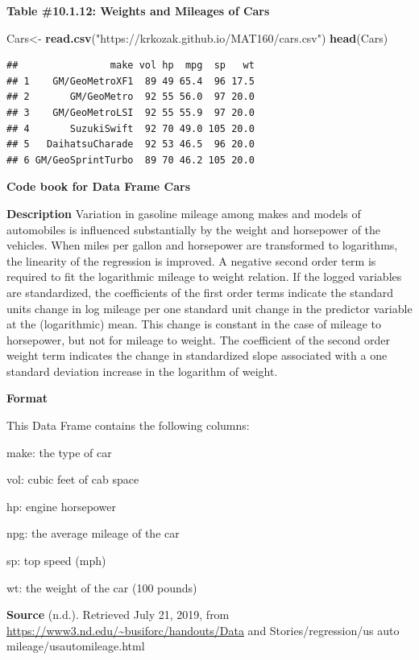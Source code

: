 \documentclass[
]{book}
\newenvironment{Shaded}{\begin{snugshade}}{\end{snugshade}}
\newcommand{\KeywordTok}[1]{\textcolor[rgb]{0.13,0.29,0.53}{\textbf{#1}}}
\newcommand{\NormalTok}[1]{#1}
\newcommand{\StringTok}[1]{\textcolor[rgb]{0.31,0.60,0.02}{#1}}
\begin{document}
\textbf{Table \#10.1.12: Weights and Mileages of Cars}

\begin{Shaded}
\begin{Highlighting}[]
\NormalTok{Cars<-}\StringTok{ }\KeywordTok{read.csv}\NormalTok{(}\StringTok{"https://krkozak.github.io/MAT160/cars.csv"}\NormalTok{)}
\KeywordTok{head}\NormalTok{(Cars)}
\end{Highlighting}
\end{Shaded}

\begin{verbatim}
##                make vol hp  mpg  sp   wt
## 1    GM/GeoMetroXF1  89 49 65.4  96 17.5
## 2       GM/GeoMetro  92 55 56.0  97 20.0
## 3    GM/GeoMetroLSI  92 55 55.9  97 20.0
## 4       SuzukiSwift  92 70 49.0 105 20.0
## 5   DaihatsuCharade  92 53 46.5  96 20.0
## 6 GM/GeoSprintTurbo  89 70 46.2 105 20.0
\end{verbatim}

\textbf{Code book for Data Frame Cars}

\textbf{Description}
Variation in gasoline mileage among makes and models of automobiles is influenced substantially by the weight and horsepower of the vehicles. When miles per gallon and horsepower are transformed to logarithms, the linearity of the regression is improved. A negative second order term is required to fit the logarithmic mileage to weight relation. If the logged variables are standardized, the coefficients of the first order terms indicate the standard units change in log mileage per one standard unit change in the predictor variable at the (logarithmic) mean. This change is constant in the case of mileage to horsepower, but not for mileage to weight. The coefficient of the second order weight term indicates the change in standardized slope associated with a one standard deviation increase in the logarithm of weight.

\textbf{Format}

This Data Frame contains the following columns:

make: the type of car

vol: cubic feet of cab space

hp: engine horsepower

npg: the average mileage of the car

sp: top speed (mph)

wt: the weight of the car (100 pounds)

\textbf{Source}
(n.d.). Retrieved July 21, 2019, from \url{https://www3.nd.edu/~busiforc/handouts/Data} and Stories/regression/us auto mileage/usautomileage.html
\end{document}
